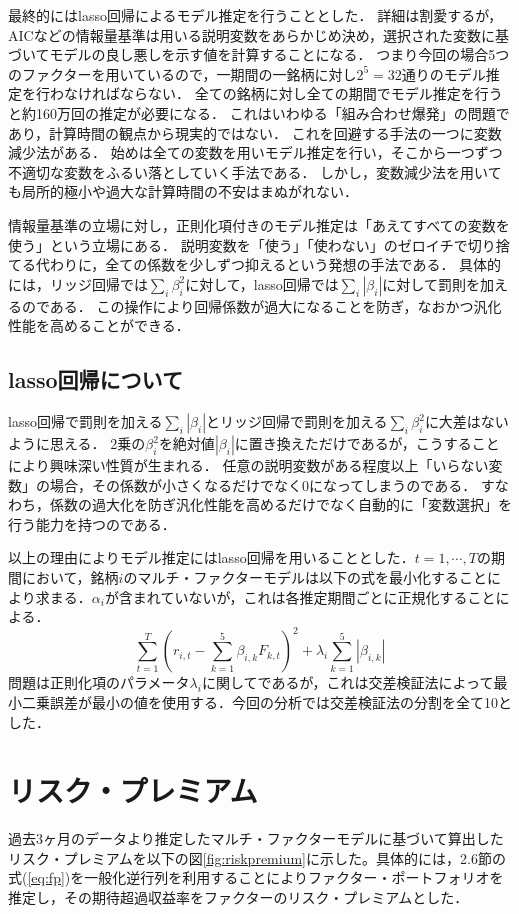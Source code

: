 \documentclass[11pt]{jreport}
\begin{document}
最終的にはlasso回帰によるモデル推定を行うこととした．
詳細は割愛するが，AICなどの情報量基準は用いる説明変数をあらかじめ決め，選択された変数に基づいてモデルの良し悪しを示す値を計算することになる．
つまり今回の場合5つのファクターを用いているので，一期間の一銘柄に対し$2^5 = 32$通りのモデル推定を行わなければならない．
全ての銘柄に対し全ての期間でモデル推定を行うと約160万回の推定が必要になる．
これはいわゆる「組み合わせ爆発」の問題であり，計算時間の観点から現実的ではない．
これを回避する手法の一つに変数減少法がある．
始めは全ての変数を用いモデル推定を行い，そこから一つずつ不適切な変数をふるい落としていく手法である．
しかし，変数減少法を用いても局所的極小や過大な計算時間の不安はまぬがれない．

情報量基準の立場に対し，正則化項付きのモデル推定は「あえてすべての変数を使う」という立場にある．
説明変数を「使う」「使わない」のゼロイチで切り捨てる代わりに，全ての係数を少しずつ抑えるという発想の手法である．
具体的には，リッジ回帰では$\sum_i\beta_i^2$に対して，lasso回帰では$\sum_i | \beta_i |$に対して罰則を加えるのである．
この操作により回帰係数が過大になることを防ぎ，なおかつ汎化性能を高めることができる．


\subsection{lasso回帰について}
lasso回帰で罰則を加える$\sum_i | \beta_i |$とリッジ回帰で罰則を加える$\sum_i\beta_i^2$に大差はないように思える．
2乗の$\beta_i^2$を絶対値$|\beta_i|$に置き換えただけであるが，こうすることにより興味深い性質が生まれる．
任意の説明変数がある程度以上「いらない変数」の場合，その係数が小さくなるだけでなく$0$になってしまうのである．
すなわち，係数の過大化を防ぎ汎化性能を高めるだけでなく自動的に「変数選択」を行う能力を持つのである．

以上の理由によりモデル推定にはlasso回帰を用いることとした．$t=1,\cdots,T$の期間において，銘柄$i$のマルチ・ファクターモデルは以下の式を最小化することにより求まる．$\alpha_i$が含まれていないが，これは各推定期間ごとに正規化することによる．
\begin{equation}
\sum_{t=1}^T\left(r_{i,t} - \sum_{k=1}^5\beta_{i,k}F_{k,t} \right)^2 + \lambda_i\sum_{k=1}^5|\beta_{i,k}|
\end{equation}
問題は正則化項のパラメータ$\lambda_i$に関してであるが，これは交差検証法によって最小二乗誤差が最小の値を使用する．今回の分析では交差検証法の分割を全て10とした．


\section{リスク・プレミアム}
過去3ヶ月のデータより推定したマルチ・ファクターモデルに基づいて算出したリスク・プレミアムを以下の図\ref{fig:riskpremium}に示した。具体的には，2.6節の式(\ref{eq:fp})を一般化逆行列を利用することによりファクター・ポートフォリオを推定し，その期待超過収益率をファクターのリスク・プレミアムとした．
\end{document}
